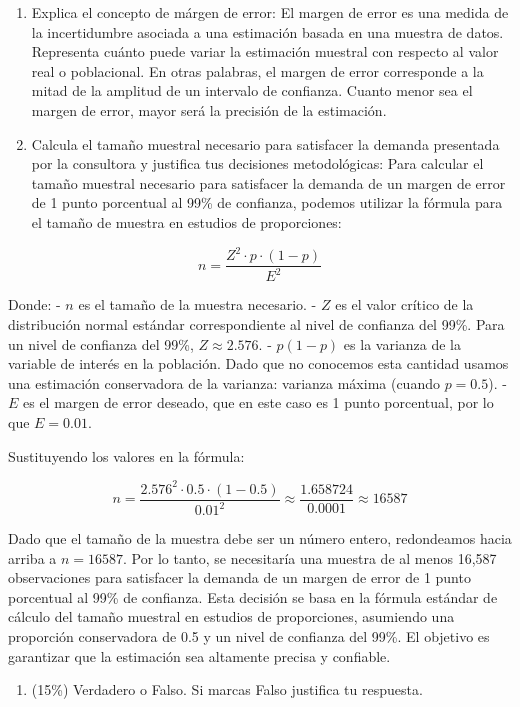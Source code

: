 \documentclass[
  letterpaper,
  DIV=11,
  numbers=noendperiod]{scrartcl}
\providecommand{\tightlist}{%
  \setlength{\itemsep}{0pt}\setlength{\parskip}{0pt}}\usepackage{longtable,booktabs,array}
\begin{document}
\begin{enumerate}
\def\labelenumi{\roman{enumi}.}
\item
  Explica el concepto de márgen de error: El margen de error es una
  medida de la incertidumbre asociada a una estimación basada en una
  muestra de datos. Representa cuánto puede variar la estimación
  muestral con respecto al valor real o poblacional. En otras palabras,
  el margen de error corresponde a la mitad de la amplitud de un
  intervalo de confianza. Cuanto menor sea el margen de error, mayor
  será la precisión de la estimación.
\item
  Calcula el tamaño muestral necesario para satisfacer la demanda
  presentada por la consultora y justifica tus decisiones metodológicas:
  Para calcular el tamaño muestral necesario para satisfacer la demanda
  de un margen de error de 1 punto porcentual al 99\% de confianza,
  podemos utilizar la fórmula para el tamaño de muestra en estudios de
  proporciones:
\end{enumerate}

\[n = \frac{Z^2 \cdot p \cdot (1-p)}{E^2}\]

Donde: - \(n\) es el tamaño de la muestra necesario. - \(Z\) es el valor
crítico de la distribución normal estándar correspondiente al nivel de
confianza del 99\%. Para un nivel de confianza del 99\%,
\(Z \approx 2.576\). - \(p(1-p)\) es la varianza de la variable de
interés en la población. Dado que no conocemos esta cantidad usamos una
estimación conservadora de la varianza: varianza máxima (cuando
\(p=0.5\)). - \(E\) es el margen de error deseado, que en este caso es 1
punto porcentual, por lo que \(E = 0.01\).

Sustituyendo los valores en la fórmula:

\[n = \frac{2.576^2 \cdot 0.5 \cdot (1-0.5)}{0.01^2} \approx \frac{1.658724}{0.0001} \approx 16587\]

Dado que el tamaño de la muestra debe ser un número entero, redondeamos
hacia arriba a \(n = 16587\). Por lo tanto, se necesitaría una muestra
de al menos 16,587 observaciones para satisfacer la demanda de un margen
de error de 1 punto porcentual al 99\% de confianza. Esta decisión se
basa en la fórmula estándar de cálculo del tamaño muestral en estudios
de proporciones, asumiendo una proporción conservadora de 0.5 y un nivel
de confianza del 99\%. El objetivo es garantizar que la estimación sea
altamente precisa y confiable.

\begin{enumerate}
\def\labelenumi{\arabic{enumi}.}
\setcounter{enumi}{7}
\tightlist
\item
  (15\%) Verdadero o Falso. Si marcas Falso justifica tu respuesta.
\end{enumerate}
\end{document}
